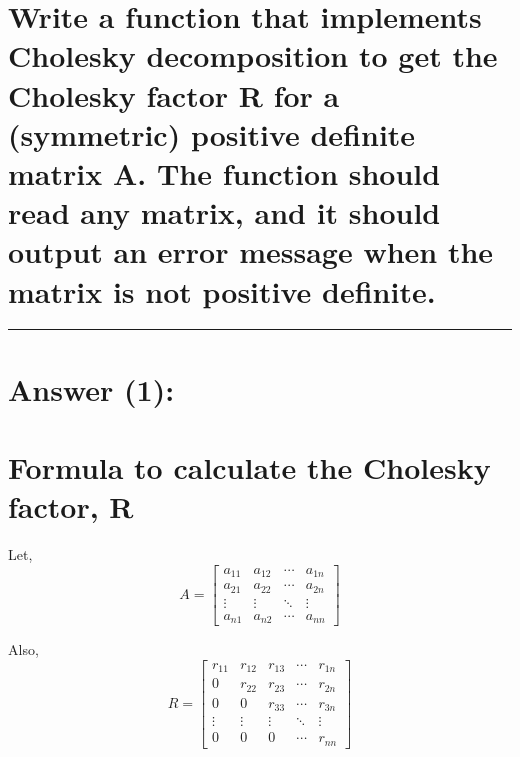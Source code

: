 \documentclass[11pt]{article}
\begin{document}
    \hypertarget{write-a-function-that-implements-cholesky-decomposition-to-get-the-cholesky-factor-r-for-a-symmetric-positive-definite-matrix-a.-the-function-should-read-any-matrix-and-it-should-output-an-error-message-when-the-matrix-is-not-positive-definite.}{%
\section{Write a function that implements Cholesky decomposition to get
the Cholesky factor R for a (symmetric) positive definite matrix A. The
function should read any matrix, and it should output an error message
when the matrix is not positive
definite.}\label{write-a-function-that-implements-cholesky-decomposition-to-get-the-cholesky-factor-r-for-a-symmetric-positive-definite-matrix-a.-the-function-should-read-any-matrix-and-it-should-output-an-error-message-when-the-matrix-is-not-positive-definite.}}

    \begin{center}\rule{0.5\linewidth}{0.5pt}\end{center}

    \hypertarget{answer-1}{%
\section{Answer (1):}\label{answer-1}}

    \hypertarget{formula-to-calculate-the-cholesky-factor-r}{%
\section{Formula to calculate the Cholesky factor,
R}\label{formula-to-calculate-the-cholesky-factor-r}}

    Let, \[A = \begin{bmatrix}
    a_{11} & a_{12} & \cdots & a_{1n} \\
    a_{21} & a_{22} & \cdots & a_{2n} \\
    \vdots & \vdots & \ddots & \vdots \\
    a_{n1} & a_{n2} & \cdots & a_{nn}
\end{bmatrix}\]

    Also, \[R = \begin{bmatrix}
    r_{11} & r_{12} & r_{13} & \cdots & r_{1n} \\
    0 & r_{22} & r_{23} & \cdots & r_{2n} \\
    0 & 0 & r_{33} & \cdots & r_{3n} \\
    \vdots & \vdots & \vdots & \ddots & \vdots \\
    0 & 0 & 0 & \cdots & r_{nn}
\end{bmatrix}\]
\end{document}
